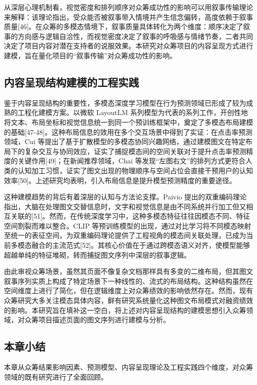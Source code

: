 从深层心理机制看，视觉密度和排列顺序对众筹成功性的影响可以用叙事传输理论来解释：该理论指出，受众能否被叙事带入情境并产生信念偏转，高度依赖于叙事质量[46]。在众筹的多模态情境下，叙事质量具体转化为两个维度：顺序决定了叙事的方向感与逻辑自洽性，而视觉密度决定了叙事的呼吸感与情绪节奏，二者共同决定了项目内容对潜在支持者的说服效果。本研究对众筹项目的内容呈现方式进行建模，旨在量化项目的``叙事传输''对众筹成功性的影响。

\subsection{内容呈现结构建模的工程实践}

鉴于内容呈现结构的重要性，多模态深度学习模型在行为预测领域已形成了较为成熟的工程化建模方案。以微软 LayoutLM 系列模型为代表的系列工作，开创性地将文本、布局坐标和视觉信息统一到同一个预训练框架中，奠定了多模态布局建模的基础[47-48]。这种布局信息的效用在多个交互场景中得到了实证：在点击率预测领域，Cui 等提出了基于扩散模型的多模态协同兴趣网络，通过建模图文在特定布局下的复杂交互与协同效应，证实了捕捉模态间的空间关联对于提升点击率预测精度的关键作用[49]；在新闻推荐领域，Chai 等发现``左图右文''的排列方式更符合人类的认知加工习惯，证实了图文出现的物理顺序与空间占位会直接干预用户的认知效率[50]。上述研究均表明，引入布局信息是提升模型预测精度的重要途径。

这种建模趋势的背后有着深层的认知与方法论支撑。Paivio 提出的双重编码理论指出，大脑在处理图文交替信息时，文字和视觉信息是由不同系统并行加工但又相互关联的[51]。然而，在传统深度学习中，这种多模态特征往往因模态不同、特征空间割裂而难以整合。CLIP 等预训练模型的出现，通过对比学习将不同模态映射至统一的表征空间，为双重编码理论提供了工程视角的模态间关联处理，已成为当前多模态融合的主流范式[52]。其核心价值在于通过跨模态语义对齐，使模型能够超越单纯的特征堆砌，转而捕捉图文序列中深层的叙事逻辑。

由此审视众筹场景，虽然其页面不像复杂文档那样具有多变的二维布局，但其图文叙事序列实质上构成了特定场景下一种线性的、流式的布局结构。这种结构虽然在空间维度上进行了简化，但在逻辑维度上对众筹绩效的影响依然存在。然而，现有众筹研究大多关注模态具体内容，鲜有研究系统量化这种图文布局模式对融资绩效的影响。本研究旨在填补这一空白，将上述对内容呈现结构的建模思想引入众筹领域，对众筹项目描述页面的图文序列进行建模与分析。

\subsection{本章小结}

本章从众筹结果影响因素、预测模型、内容呈现理论及工程实践四个维度，对众筹领域的既有研究进行了全面回顾。


